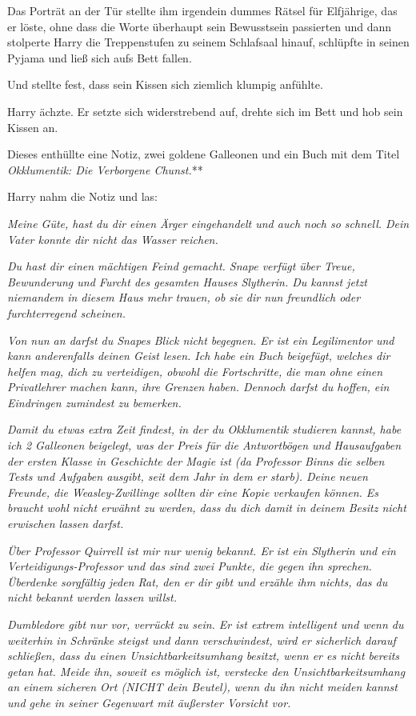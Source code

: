 {Das Porträt an der Tür stellte ihm irgendein dummes Rätsel für Elfjährige, das er löste, ohne dass die Worte überhaupt sein Bewusstsein passierten und dann stolperte Harry die Treppenstufen zu seinem Schlafsaal hinauf, schlüpfte in seinen Pyjama und ließ sich aufs Bett fallen.

Und stellte fest, dass sein Kissen sich ziemlich klumpig anfühlte.

Harry ächzte. Er setzte sich widerstrebend auf, drehte sich im Bett und hob sein Kissen an.

Dieses enthüllte eine Notiz, zwei goldene Galleonen und ein Buch mit dem Titel \emph{Okklumentik: Die Verborgene Chunst.}**

Harry nahm die Notiz und las:

\emph{Meine Güte, hast du dir einen Ärger eingehandelt und auch noch so schnell. Dein Vater konnte dir nicht das Wasser reichen.}

\emph{Du hast dir einen mächtigen Feind gemacht. Snape verfügt über Treue, Bewunderung und Furcht des gesamten Hauses Slytherin. Du kannst jetzt niemandem in diesem Haus mehr trauen, ob sie dir nun freundlich oder furchterregend scheinen.}

\emph{Von nun an darfst du Snapes Blick nicht begegnen. Er ist ein Legilimentor und kann anderenfalls deinen Geist lesen. Ich habe ein Buch beigefügt, welches dir helfen mag, dich zu verteidigen, obwohl die Fortschritte, die man ohne einen Privatlehrer machen kann, ihre Grenzen haben. Dennoch darfst du hoffen, ein Eindringen zumindest zu bemerken.}

\emph{Damit du etwas extra Zeit findest, in der du Okklumentik studieren kannst, habe ich 2 Galleonen beigelegt, was der Preis für die Antwortbögen und Hausaufgaben der ersten Klasse in Geschichte der Magie ist (da Professor Binns die selben Tests und Aufgaben ausgibt, seit dem Jahr in dem er starb). Deine neuen Freunde, die Weasley-Zwillinge sollten dir eine Kopie verkaufen können. Es braucht wohl nicht erwähnt zu werden, dass du dich damit in deinem Besitz nicht erwischen lassen darfst.}

\emph{Über Professor Quirrell ist mir nur wenig bekannt. Er ist ein Slytherin und ein Verteidigungs-Professor und das sind zwei Punkte, die gegen ihn sprechen. Überdenke sorgfältig jeden Rat, den er dir gibt und erzähle ihm nichts, das du nicht bekannt werden lassen willst.}

\emph{Dumbledore gibt nur vor, verrückt zu sein. Er ist extrem intelligent und wenn du weiterhin in Schränke steigst und dann verschwindest, wird er sicherlich darauf schließen, dass du einen Unsichtbarkeitsumhang besitzt, wenn er es nicht bereits getan hat. Meide ihn, soweit es möglich ist, verstecke den Unsichtbarkeitsumhang an einem sicheren Ort (NICHT dein Beutel), wenn du ihn nicht meiden kannst und gehe in seiner Gegenwart mit äußerster Vorsicht vor.}

}
